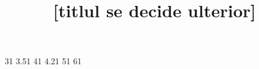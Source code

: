 \documentclass[11pt]{article}
\title{[titlul se decide ulterior]}
\author{}
\begin{document}
\maketitle



\makeatletter
\def\pinlabel#1#2{\expandafter\gdef\csname r@#1\endcsname{{#2}{1}{}{}{}}}
\pinlabel{section:approach}{3}
\pinlabel{sec:tuning}{3.5}
\pinlabel{sec:results}{4}
\pinlabel{sec:14items}{4.2}
\pinlabel{sec:negative}{5}
\pinlabel{section:conclusions}{6}
\makeatother




\end{document}
